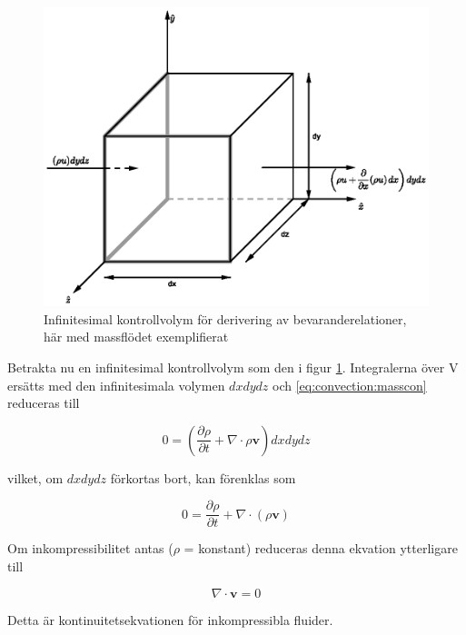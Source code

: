 \begin{figure}[hpbt]
\centering
\includegraphics[scale=1]{images/massflowcube.eps}
\caption{\label{fig:massflowcube} Infinitesimal kontrollvolym för derivering av bevaranderelationer, här med massflödet exemplifierat}
\end{figure}

Betrakta nu en infinitesimal kontrollvolym som den i figur \ref{fig:massflowcube}. Integralerna över V ersätts med den infinitesimala volymen $dxdydz$ och \eqref{eq:convection:masscon} reduceras till

\begin{equation}
\label{eq:convection:massconinf}
0 = \left( \frac{\partial \rho}{\partial t} + \nabla \cdot \rho \mathbf{v}\right) dxdydz
\end{equation}

vilket, om $dxdydz$ förkortas bort, kan förenklas som

\begin{equation}
\label{eq:convection:continuity}
\boxed{ \; \; \;
0 = \frac{\partial \rho}{\partial t} + \nabla \cdot \left( \rho \mathbf{v} \right) 
\; \; \; }
\end{equation}

Om inkompressibilitet antas ($\rho$ = konstant) reduceras denna ekvation ytterligare till

\begin{equation}
\label{eq:convection:continuityinc}
\nabla \cdot \mathbf{v} = 0
\end{equation}

Detta är kontinuitetsekvationen för inkompressibla fluider.

